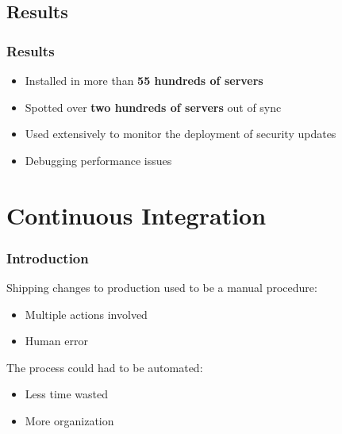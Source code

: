 \documentclass[aspectratio=169]{beamer}
\begin{document}
\subsection{Results}
\begin{frame}
    \frametitle{Results}
    \begin{itemize}
        \item Installed in more than \textbf{55 hundreds of servers}
        \item Spotted over \textbf{two hundreds of servers} out of sync
        \item Used extensively to monitor the deployment of security updates
        \item Debugging performance issues
    \end{itemize}
\end{frame}

\section{Continuous Integration}

\begin{frame}
    \frametitle{Introduction}
    Shipping changes to production used to be a manual procedure:
    \begin{itemize}
        \item Multiple actions involved
        \item Human error
    \end{itemize}

    The process could had to be automated:
    \begin{itemize}
        \item Less time wasted
        \item More organization
    \end{itemize}
\end{frame}

\end{document}
